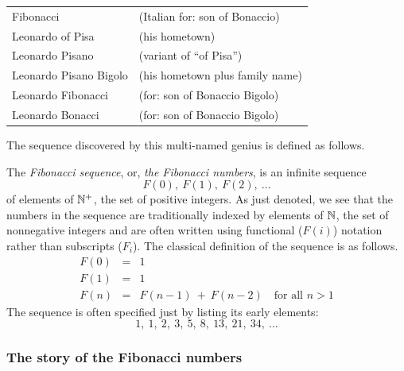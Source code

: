 \begin{tabular}{ll}
Fibonacci               & (Italian for: son of Bonaccio) \\
Leonardo of Pisa        & (his hometown) \\
Leonardo Pisano         & (variant of ``of Pisa'') \\
Leonardo Pisano Bigolo  & (his hometown plus family name) \\
Leonardo Fibonacci      & (for: son of Bonaccio Bigolo) \\
Leonardo Bonacci        & (for: son of Bonaccio Bigolo) \\
\end{tabular}

\medskip

\noindent
The sequence discovered by this multi-named genius is defined as follows.

\medskip

The {\it Fibonacci sequence}, or, {\it the Fibonacci numbers}, is an
infinite sequence
\[ F(0), \ F(1), \ F(2), \ \ldots \]
of elements of $\mathbb{N}^+$, the set of positive integers.  As just denoted,
we see that the numbers in the sequence are traditionally indexed by
elements of $\mathbb{N}$, the set of nonnegative integers and are often
written using functional ($F(i)$) notation rather than subscripts
($F_i$).  The classical definition of the sequence is as follows.
\begin{eqnarray}
\nonumber
F(0) & = & 1 \\
\label{eq:Fibonacci-defn}
F(1) & = & 1 \\
\nonumber
F(n) & = & F(n-1) \ + \ F(n-2) \ \ \ \mbox{ for all } n > 1
\end{eqnarray}
The sequence is often specified just by listing its early elements:
\[ 1, \ 1, \ 2, \ 3, \ 5, \ 8, \ 13, \ 21, \ 34, \ \ldots \]


\subsubsection{The story of the Fibonacci numbers}
\label{sec:Fibonacci-story}

